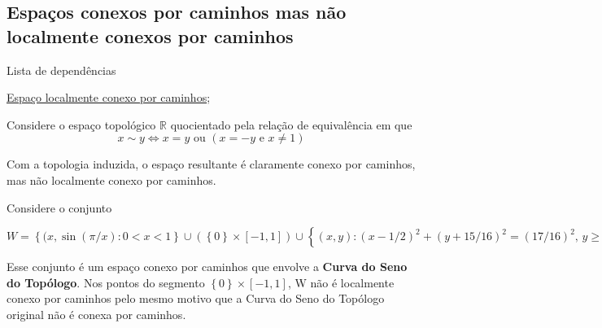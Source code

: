 \subsection{Espaços conexos por caminhos mas não localmente conexos por caminhos}
\label{localmente-conexo-por-caminhos-ex}
\begin{titlemize}{Lista de dependências}
	\item \hyperref[localmente-conexo-por-caminhos-def]{Espaço localmente conexo por caminhos};\\ %
\end{titlemize}

\begin{ex}
	Considere o espaço topológico $\mathbb{R}$ quocientado pela relação de equivalência em que 
    \begin{equation}
        x \sim y \iff x = y \text{ ou } (x = -y \text{ e } x \neq 1)
    \end{equation}
\end{ex}

Com a topologia induzida, o espaço resultante é claramente conexo por caminhos, mas não localmente conexo por caminhos.

\begin{ex}
        Considere o conjunto
    \begin{center}
        $W = \left\{ (x, \sin(\pi / x) : 0 < x < 1 \right\} \cup ( \left\{0\right\} \times [-1, 1] ) \cup \left\{ (x,y) : (x - 1/2)^2 + (y + 15/16)^2 = (17/16)^2 \text{, } y \geqslant 0 \right\}$
    \end{center}
\end{ex}

Esse conjunto é um espaço conexo por caminhos que envolve a \textbf{Curva do Seno do Topólogo}. Nos pontos do segmento $\left\{0\right\} \times [-1, 1]$, W não é localmente conexo por caminhos pelo mesmo motivo que a Curva do Seno do Topólogo original não é conexa por caminhos.

